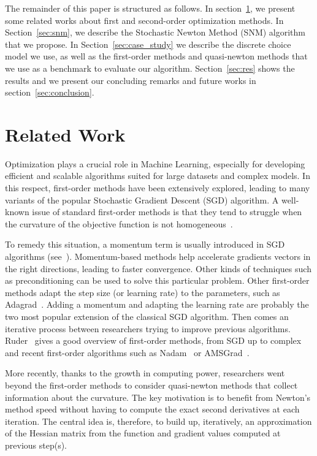 \documentclass[conference]{IEEEtran}
\begin{document}
The remainder of this paper is structured as follows. In section~\ref{sec:rel_work}, we present some related works about first and second-order optimization methods. In Section~\ref{sec:snm}, we describe the Stochastic Newton Method (SNM) algorithm that we propose. In Section~\ref{sec:case_study} we describe the discrete choice model we use, as well as the first-order methods and quasi-newton methods that we use as a benchmark to evaluate our algorithm. Section~\ref{sec:res} shows the results and we present our concluding remarks and future works in section~\ref{sec:conclusion}. 

\section{Related Work}
\label{sec:rel_work}

Optimization plays a crucial role in Machine Learning, especially for developing efficient and scalable algorithms suited for large datasets and complex models. In this respect, first-order methods have been extensively explored, leading to many variants of the popular Stochastic Gradient Descent (SGD) algorithm. A well-known issue of standard first-order methods is that they tend to struggle when the curvature of the objective function is not homogeneous~\cite{sutton_two_1986}.

 To remedy this situation, a momentum term is usually introduced in SGD algorithms (see~\cite{qian_momentum_1999}). Momentum-based methods help accelerate gradients vectors in the right directions, leading to faster convergence. Other kinds of techniques such as preconditioning can be used to solve this particular problem. Other first-order methods adapt the step size (or learning rate) to the parameters, such as Adagrad~\cite{duchi_adaptive_2011}. Adding a momentum and adapting the learning rate are probably the two most popular extension of the classical SGD algorithm. Then comes an iterative process between researchers trying to improve previous algorithms. Ruder~\cite{ruder_overview_2016} gives a good overview of first-order methods, from SGD up to complex and recent first-order algorithms such as Nadam~\cite{dozat_incorporating_2016} or AMSGrad~\cite{reddi_convergence_2018}. 

More recently, thanks to the growth in computing power, researchers went beyond the first-order methods to consider quasi-newton methods that collect information about the curvature. The key motivation is to benefit from Newton's method speed without having to compute the exact second derivatives at each iteration. The central idea is, therefore, to build up, iteratively, an approximation of the Hessian matrix from the function and gradient values computed at previous step(s). 
\end{document}
